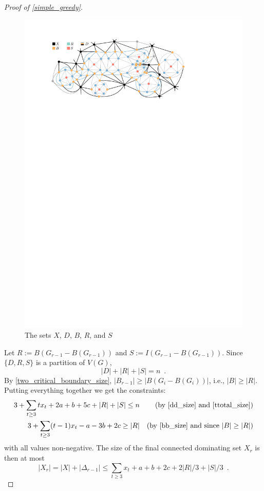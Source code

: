 \documentclass[a4paper,UKenglish,cleveref, autoref, thm-restate]{lipics-v2021}
\begin{document}
\begin{proof}[Proof of \cref{simple_greedy}]
  \begin{figure}
      \centering
      \includegraphics{figs/dbrs}
      \caption{The sets $X$, $D$, $B$, $R$, and $S$}
      \label{dbrs}
  \end{figure}

  Let $R:=B(G_{r-1}-B(G_{r-1}))$ and $S:=I(G_{r-1}-B(G_{r-1}))$.  Since $\{D,R,S\}$ is a partition of $V(G)$,
  \begin{equation}
    |D|+|R|+|S|= n \enspace . \label{ttotal_size}
  \end{equation}
  By \cref{two_critical_boundary_size}, $|B_{r-1}|\ge |B(G_i-B(G_i))|$, i.e., $|B|\ge |R|$.  Putting everything together we get the constraints:
  \begin{align}
        3 + \sum_{t\ge 3}tx_t + 2a + b + 5c + |R| + |S| \le n&
          & \text{(by \cref{dd_size} and \cref{ttotal_size})}  \label{a} \\
        3 + \sum_{t\ge 3}(t-1)x_t - a - 3b + 2c \ge |R|
          & & \text{(by \cref{bb_size} and since $|B|\ge |R|$)} \label{b} \\
  \end{align}
  with all values non-negative.  The size of the final connected dominating set $X_r$ is then at most
  \begin{equation}
    |X_r| = |X| + |\Delta_{r-1}| \le \sum_{t\ge 3}x_t + a + b + 2c + 2|R|/3 + |S|/3  \enspace . \label{oobjective}
  \end{equation}


\end{proof}
\end{document}

